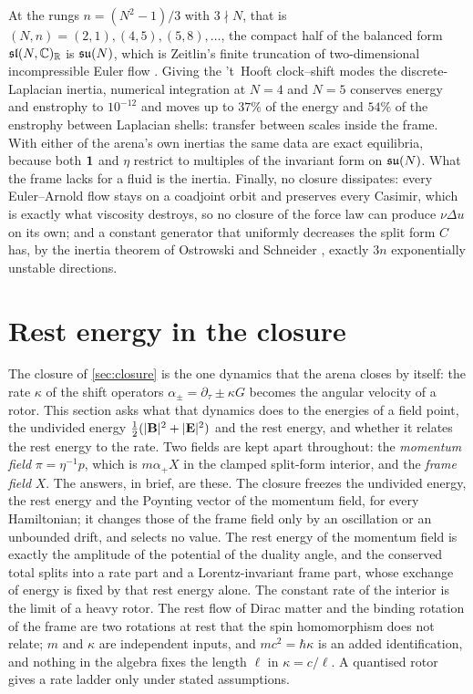 At the rungs $n=(N^2-1)/3$ with $3\nmid N$, that is $(N,n)=(2,1),(4,5),(5,8),\dots$, the compact half of the balanced form $\mathfrak{sl}(N,\mathbb{C})_{\mathbb{R}}$ is $\mathfrak{su}(N)$,
which is Zeitlin's finite truncation of two-dimensional incompressible Euler flow \cite{Zeitlin91}. Giving the 't~Hooft clock--shift modes the
discrete-Laplacian inertia, numerical integration at $N=4$ and $N=5$ conserves energy and enstrophy to $10^{-12}$ and moves up to $37\%$ of the
energy and $54\%$ of the enstrophy between Laplacian shells: transfer between scales inside the frame. With either of the arena's own inertias the same
data are exact equilibria, because both $\mathbf 1$ and $\eta$ restrict to multiples of the invariant form on $\mathfrak{su}(N)$. What the frame lacks for a fluid is
the inertia. Finally, no closure dissipates: every Euler--Arnold flow stays on a coadjoint orbit and preserves every Casimir, which is exactly what
viscosity destroys, so no closure of the force law can produce $\nu\Delta u$ on its own; and a constant generator that uniformly decreases the split
form $C$ has, by the inertia theorem of Ostrowski and Schneider \cite{OstrowskiSchneider62}, exactly $3n$ exponentially unstable directions.



\section{Rest energy in the closure}
\label{sec:restclosure}

The closure of \cref{sec:closure} is the one dynamics that the arena closes by itself: the rate $\kappa$ of the shift operators
$\alpha_\pm=\partial_\tau\pm\kappa G$ becomes the angular velocity of a rotor. This section asks what that dynamics does to the energies of a
field point, the undivided energy $\tfrac12(|\mathbf B|^2+|\mathbf E|^2)$ and the rest energy, and whether it relates the rest energy to the rate. Two fields
are kept apart throughout: the \emph{momentum field} $\pi=\eta^{-1}p$, which is $m\alpha_+X$ in the clamped split-form interior, and the
\emph{frame field} $X$. The answers, in brief, are these. The closure freezes the undivided energy, the rest energy and the Poynting vector of the momentum
field, for every Hamiltonian; it changes those of the frame field only by an oscillation or an unbounded drift, and selects no value. The rest
energy of the momentum field is exactly the amplitude of the potential of the duality angle, and the conserved total splits into a rate part and a
Lorentz-invariant frame part, whose exchange of energy is fixed by that rest energy alone. The constant rate of the interior is the limit of a heavy rotor. The rest flow of Dirac
matter and the binding rotation of the frame are two rotations at rest that the spin homomorphism does not relate; $m$ and $\kappa$ are independent inputs, and $mc^2=\hbar\kappa$ is an added
identification, and nothing in the algebra fixes the length $\ell$ in $\kappa=c/\ell$. A quantised rotor gives a rate ladder only under stated
assumptions.


